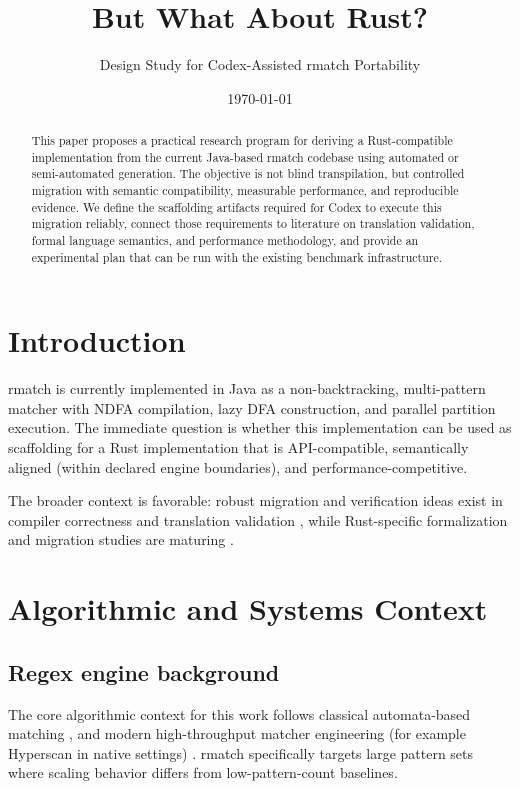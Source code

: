\documentclass[11pt]{article}
\title{But What About Rust?}
\author{Design Study for Codex-Assisted rmatch Portability}
\date{\today}
\begin{document}
\maketitle

\begin{abstract}
This paper proposes a practical research program for deriving a Rust-compatible implementation from the current Java-based rmatch codebase using automated or semi-automated generation. The objective is not blind transpilation, but controlled migration with semantic compatibility, measurable performance, and reproducible evidence. We define the scaffolding artifacts required for Codex to execute this migration reliably, connect those requirements to literature on translation validation, formal language semantics, and performance methodology, and provide an experimental plan that can be run with the existing benchmark infrastructure.
\end{abstract}

\tableofcontents

\section{Introduction}
rmatch is currently implemented in Java as a non-backtracking, multi-pattern matcher with NDFA compilation, lazy DFA construction, and parallel partition execution. The immediate question is whether this implementation can be used as scaffolding for a Rust implementation that is API-compatible, semantically aligned (within declared engine boundaries), and performance-competitive.

The broader context is favorable: robust migration and verification ideas exist in compiler correctness and translation validation \cite{pnueli1998,leroy2009}, while Rust-specific formalization and migration studies are maturing \cite{jung2018rustbelt,nguyen2022inrustwetrust,c2rust2025cacm,rustmap2025,safetrans2025,c2saferust2025,c2rustbench2025}.

\section{Algorithmic and Systems Context}
\subsection{Regex engine background}
The core algorithmic context for this work follows classical automata-based matching \cite{thompson1968,aho1975}, and modern high-throughput matcher engineering (for example Hyperscan in native settings) \cite{wang2019hyperscan}. rmatch specifically targets large pattern sets where scaling behavior differs from low-pattern-count baselines.
\end{document}
